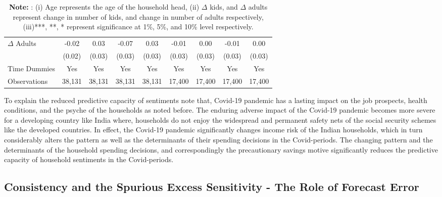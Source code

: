 \documentclass[
  abstract]{scrartcl}
\begin{document}
\begin{table}
{\begin{threeparttable}
{\begin{tabular}{l cc cc  cc cc}
\addlinespace
$\Delta$ Adults  & -0.02  & 0.03  & -0.07  & 0.03  & -0.01  & 0.00  & -0.01  & 0.00  \\ 
                 & (0.02) & (0.03) & (0.03) & (0.03) & (0.03) & (0.03) & (0.03) & (0.03) \\ 
\midrule
Time Dummies  & Yes  & Yes  & Yes  & Yes  & Yes  & Yes  & Yes  & Yes  \\ 
Observations  & 38,131  & 38,131  & 38,131  & 38,131  & 17,400  & 17,400  & 17,400  & 17,400  \\ 
\bottomrule
\end{tabular}
}
\end{threeparttable}
\caption*{\footnotesize \textbf{Note:} : (i) Age represents the age of the household head, (ii) $\Delta$ kids, and $\Delta$ adults  represent change in number of kids, and change in number of adults respectively, (iii)***, **, * represent significance at 1\%, 5\%, and 10\% level respectively.}

}

\end{table}%

To explain the reduced predictive capacity of sentiments note that,
Covid-19 pandemic has a lasting impact on the job prospects, health
conditions, and the psyche of the households as noted before. The
enduring adverse impact of the Covid-19 pandemic becomes more severe for
a developing country like India where, households do not enjoy the
widespread and permanent safety nets of the social security schemes like
the developed countries. In effect, the Covid-19 pandemic significantly
changes income risk of the Indian households, which in turn considerably
alters the pattern as well as the determinants of their spending
decisions in the Covid-periods. The changing pattern and the
determinants of the household spending decisions, and correspondingly
the precautionary savings motive significantly reduces the predictive
capacity of household sentiments in the Covid-periods.

\subsection{Consistency and the Spurious Excess Sensitivity - The Role
of Forecast
Error}\label{consistency-and-the-spurious-excess-sensitivity---the-role-of-forecast-error}
\end{document}

